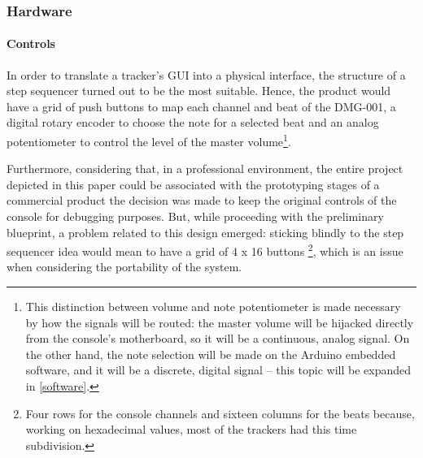 \documentclass[]{article}
\begin{document}
        \subsubsection{Hardware}
            \paragraph{Controls}
            In order to translate a tracker's GUI into a physical interface, the structure of a step sequencer turned out to be the most suitable. Hence,
            the product would have a grid of push buttons to map each channel and beat of the DMG-001, a digital rotary encoder to choose the note for a selected beat
            and an analog potentiometer to control the level of the master volume\footnote{This distinction between volume and note potentiometer is made necessary by how the signals will 
            be routed: the master volume will be hijacked directly from the console's motherboard, so it will be a continuous, analog signal. On the other hand, the note selection
            will be made on the Arduino embedded software, and it will be a discrete, digital signal -- this topic will be expanded in \ref{software}.}.

            Furthermore, considering that, in a professional environment, the entire project depicted in this paper could be associated with the prototyping stages of a commercial product
            the decision was made to keep the original controls of the console for debugging purposes. 
            But, while proceeding with the preliminary blueprint, a problem related to this design emerged: sticking blindly to the step sequencer idea would mean to have a grid of 4 x 16 buttons
            \footnote{Four rows for the console channels and sixteen columns for the beats because, working on hexadecimal values, most of the trackers 
            had this time subdivision.}, which is an issue when considering the portability of the system.
\end{document}
